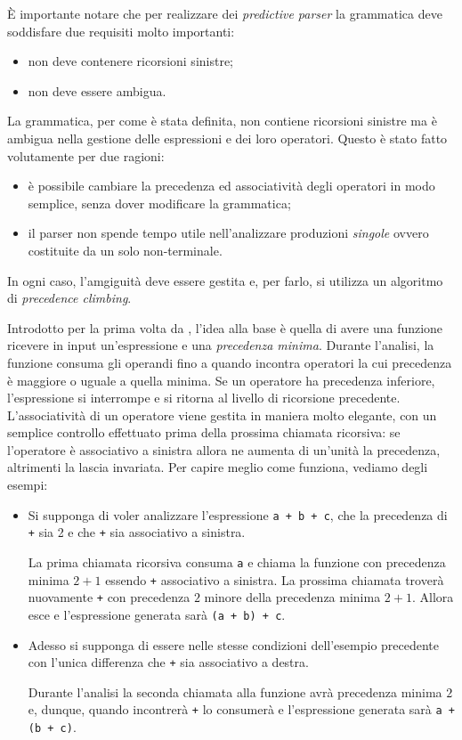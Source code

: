\`E importante notare che per realizzare dei \emph{predictive parser} la grammatica deve soddisfare due requisiti molto importanti:
\begin{itemize}
	\item non deve contenere ricorsioni sinistre;
	\item non deve essere ambigua.
\end{itemize}

La grammatica, per come \`e stata definita, non contiene ricorsioni sinistre ma \`e ambigua nella gestione delle espressioni e dei loro operatori. Questo \`e stato fatto volutamente per due ragioni:
\begin{itemize}
	\item \`e possibile cambiare la precedenza ed associativit\`a degli operatori in modo semplice, senza dover modificare la grammatica;
	\item il parser non spende tempo utile nell'analizzare produzioni \textit{singole} ovvero costituite da un solo non-terminale.
\end{itemize}
In ogni caso, l'amgiguit\`a deve essere gestita e, per farlo, si utilizza un algoritmo di \emph{precedence climbing}.

Introdotto per la prima volta da \cite{barron1981bcpl}, l'idea alla base \`e quella di avere una funzione ricevere in input un'espressione e una \emph{precedenza minima}. Durante l'analisi, la funzione consuma gli operandi fino a quando incontra operatori la cui precedenza \`e maggiore o uguale a quella minima. Se un operatore ha precedenza inferiore, l'espressione si interrompe e si ritorna al livello di ricorsione precedente. L'associativit\`a di un operatore viene gestita in maniera molto elegante, con un semplice controllo effettuato prima della prossima chiamata ricorsiva: se l'operatore \`e associativo a sinistra allora ne aumenta di un'unit\`a la precedenza, altrimenti la lascia invariata. Per capire meglio come funziona, vediamo degli esempi:
\begin{itemize}
	\item Si supponga di voler analizzare l'espressione \texttt{a + b + c}, che la precedenza di \texttt{+} sia 2 e che \texttt{+} sia associativo a sinistra.

	La prima chiamata ricorsiva consuma \texttt{a} e chiama la funzione con precedenza minima $2 + 1$ essendo \texttt{+} associativo a sinistra. La prossima chiamata trover\`a nuovamente \texttt{+} con precedenza $2$ minore della precedenza minima $2 + 1$. Allora esce e l'espressione generata sar\`a \linebreak \texttt{(a + b) + c}.
	\item Adesso si supponga di essere nelle stesse condizioni dell'esempio precedente con l'unica differenza che \texttt{+} sia associativo a destra.

	Durante l'analisi la seconda chiamata alla funzione avr\`a precedenza minima $2$ e, dunque, quando incontrer\`a \texttt{+} lo consumer\`a e l'espressione generata sar\`a \texttt{a + (b + c)}.
\end{itemize}

